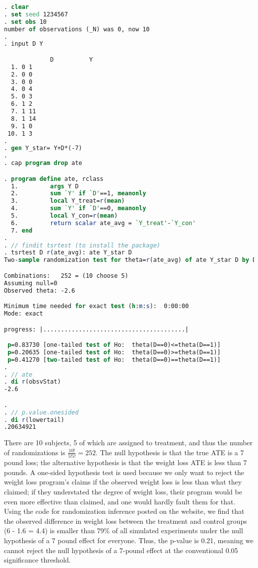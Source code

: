 \documentclass[11pt,notitlepage]{article}\usepackage[]{graphicx}\usepackage[]{color}
\begin{document}
\begin{lstlisting}[language=stata]
. clear
. set seed 1234567
. set obs 10
number of observations (_N) was 0, now 10
. 
. input D Y

             D          Y
  1. 0 1 
  2. 0 0 
  3. 0 0 
  4. 0 4 
  5. 0 3 
  6. 1 2 
  7. 1 11 
  8. 1 14 
  9. 1 0 
 10. 1 3 
. 
. gen Y_star= Y+D*(-7)
. 
. cap program drop ate

. program define ate, rclass
  1.         args Y D
  2.         sum `Y' if `D'==1, meanonly
  3.         local Y_treat=r(mean)
  4.         sum `Y' if `D'==0, meanonly
  5.         local Y_con=r(mean)
  6.         return scalar ate_avg = `Y_treat'-`Y_con'
  7. end
. 
. // findit tsrtest (to install the package)
. tsrtest D r(ate_avg): ate Y_star D
Two-sample randomization test for theta=r(ate_avg) of ate Y_star D by D

Combinations:   252 = (10 choose 5)
Assuming null=0
Observed theta: -2.6

Minimum time needed for exact test (h:m:s):  0:00:00
Mode: exact

progress: |........................................|

 p=0.83730 [one-tailed test of Ho:  theta(D==0)<=theta(D==1)]
 p=0.20635 [one-tailed test of Ho:  theta(D==0)>=theta(D==1)]
 p=0.41270 [two-tailed test of Ho:  theta(D==0)==theta(D==1)]
. 
. // ate
. di r(obsvStat)       
-2.6

. 
. // p.value.onesided
. di r(lowertail)   
.20634921

\end{lstlisting}

There are 10 subjects, 5 of which are assigned to treatment, and thus the number of randomizations is $\frac{10!}{5!5!}=252$.  The null hypothesis is that the true ATE is a 7 pound loss; the alternative hypothesis is that the weight loss ATE is less than 7 pounds.  A one-sided hypothesis test is used because we only want to reject the weight loss program's claims if the observed weight loss is less than what they claimed; if they understated the degree of weight loss, their program would be even more effective than claimed, and one would hardly fault them for that.  Using the code for randomization inference posted on the website, we find that the observed difference in weight loss between the treatment and control groups (6 - 1.6 = 4.4) is smaller than 79\% of all simulated experiments under the null hypothesis of a 7 pound effect for everyone.  Thus, the p-value is 0.21, meaning we cannot reject the null hypothesis of a 7-pound effect at the conventional 0.05 significance threshold.
\end{document}
